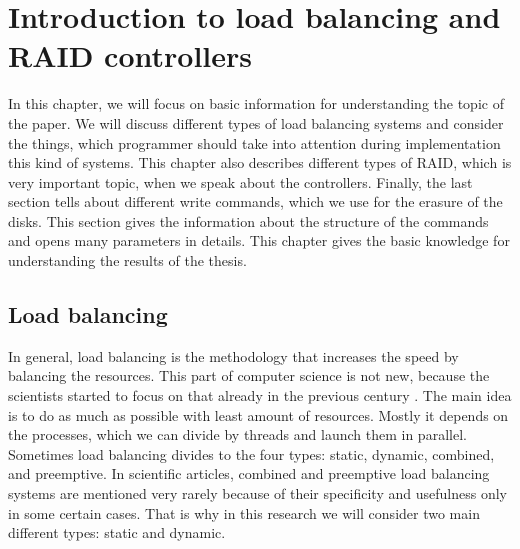 \chapter{Introduction to load balancing and RAID controllers}
\label{chap2:title}

In this chapter, we will focus on basic information for understanding the topic of the paper. We will discuss different types of load balancing systems and consider the things, which programmer should take into attention during implementation this kind of systems. This chapter also describes different types of RAID, which is very important topic, when we speak about the controllers. Finally, the last section tells about different write commands, which we use for the erasure of the disks. This section gives the information about the structure of the commands and opens many parameters in details. This chapter gives the basic knowledge for understanding the results of the thesis.

\newpage
\section{Load balancing}
In general, load balancing is the methodology that increases the speed by balancing the resources. This part of computer science is not new, because the scientists started to focus on that already in the previous century \cite{stat_load_bal_1985}. The main idea is to do as much as possible with least amount of resources. Mostly it depends on the processes, which we can divide by threads and launch them in parallel. Sometimes load balancing divides to the four types: static, dynamic, combined, and preemptive. In scientific articles, combined and preemptive load balancing systems are mentioned very rarely because of their specificity and usefulness only in some certain cases. That is why in this research we will consider two main different types: static and dynamic.

